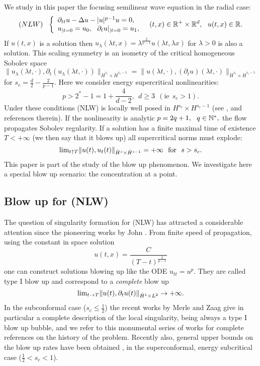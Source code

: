 \documentclass[11pt,a4paper,reqno]{amsart}
\theoremstyle{remark}
\numberwithin{equation}{section}
\begin{document}
We study in this paper the focusing semilinear wave equation in the radial case:
\begin{equation}
\label{nlw}
(NLW)\ \ \left\{\begin{array}{ll}{\partial}_{tt}u-\Delta u-|u|^{p-1}u=0, \\u_{|t=0}=u_0, \ \ {\partial}_tu|_{|t=0}=u_1,\end{array}\right.\ \ (t,x)\in \Bbb R^+\times \Bbb R^d, \ \ u(t,x)\in \Bbb R.
\end{equation}
If $u(t,x)$ is a solution then $u_{\lambda}(\lambda t,x)={\lambda}^{\frac2{p-1}}u({\lambda} t,{\lambda} x)$ for ${\lambda}>0$ is also a solution. This scaling symmetry is an isometry of the critical homogeneous Sobolev space 
$$\|u_{\lambda}(\lambda t,\cdot),\partial_t (u_{\lambda}(\lambda t,\cdot))\|_{\dot{H}^{s_c}\times\dot{H}^{s_c-1}}=\|u({\lambda} t,\cdot),(\partial_t u)(\lambda t,\cdot)\|_{\dot{H}^{s_c}\times \dot{H}^{s_c-1}}$$
for $s_c=\frac d 2-\frac {2}{p-1}.$ Here we consider energy supercritical nonlinearities: 
$$p> 2^*-1=1+\frac{4}{d-2}, \ \ d\ge 3\ \ (\mbox{ie}\ \ s_c> 1).$$
Under these conditions (NLW) is locally well posed in $H^{s_c}\times H^{s_c-1}$ (see \cite{LS}, \cite{Tao} and references therein). If the nonlinearity is analytic $p=2q+1, \ \ q\in \Bbb N^*,$ the flow propagates Sobolev regularity. If a solution has a finite maximal time of existence $T<+\infty$ (we then say that it blows up) all supercritical norms must explode: 
$$ {\mathop{\rm lim}}_{t\uparrow T}\|u(t),u_t(t)\|_{\dot{H}^s\times \dot{H}^{s-1}}=+\infty \ \ \mbox{for}\ \ s>s_c.$$
This paper is part of the study of the blow up phenomenon. We investigate here a special blow up scenario: the concentration at a point.

\subsection{Blow up for (NLW)}

The question of singularity formation for (NLW) has attracted a considerable attention since the pioneering works by John \cite{john}. From finite speed of propagation, using the constant in space solution
$$
u(t,x)=\frac{C}{(T-t)^{\frac{2}{p-1}}}
$$
one can construct solutions blowing up like the ODE $u_{tt}=u^p$. They are called type I blow up and correspond to a {\it complete} blow up 
$${\mathop{\rm lim}}_{t\to T}\| u(t),\partial_tu(t)\|_{\dot{H}^1\times L^2}\to +\infty.$$
In the subconformal case ($s_c\leq \frac{1}{2}$) the recent works by Merle and Zaag \cite{MZ1,MZ5,MZ2} give in particular a complete description of the local singularity, being always a type I blow up bubble, and we refer to this monumental series of works for complete references on the history of the problem. Recently also, general upper bounds on the blow up rates have been obtained \cite{HZ}, \cite{KV} in the superconformal, energy subcritical case ($\frac{1}{2}<s_c<1$).\\
\end{document}
